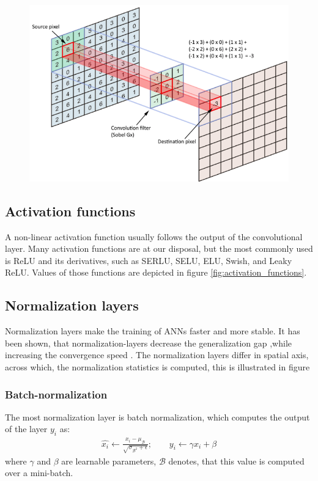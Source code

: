 \begin{figure}
    \centering
    \includegraphics[width=0.9\linewidth]{images/conv_img.png}
\end{figure}

\subsection{Activation functions}
A non-linear activation function usually follows the output of the convolutional layer. Many activation functions are at our disposal, but the most commonly used is ReLU and its derivatives, such as SERLU, SELU, ELU, Swish, and Leaky ReLU. Values of those functions are depicted in figure \ref{fig:activation_functions}.

\subsection{Normalization layers}
\label{sec:normalization_layers}
Normalization layers make the training of ANNs faster and more stable. It has been shown, that normalization-layers decrease the generalization gap ,while increasing the convergence speed \cite{Ioffe2015,Wu2018}. The normalization layers differ in spatial axis, across which, the normalization statistics is computed, this is illustrated in figure
\subsubsection{Batch-normalization}
The most normalization layer is batch normalization, which computes the output of the layer $y_i$ as:
\begin{align}
    \hat{x_i} \leftarrow \frac{x_i - \mu_{\mathcal{B}}}{\sqrt{ \sigma _{\mathcal{B}^2} + \epsilon}}; \qquad y_i \leftarrow \gamma \hat{x_i} + \beta
\end{align}
where $\gamma$ and $\beta$ are learnable parameters, $\mathcal{B}$ denotes, that this value is computed over a mini-batch.


